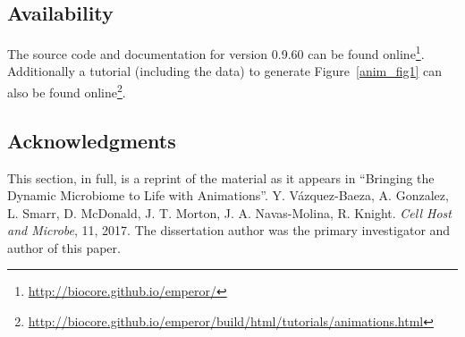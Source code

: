\subsection{Availability}
The source code and documentation for version 0.9.60 can be found online\footnote{\url{http://biocore.github.io/emperor/}}. Additionally a tutorial (including the data) to generate Figure~\ref{anim_fig1} can also be found online\footnote{\url{http://biocore.github.io/emperor/build/html/tutorials/animations.html}}. 

\subsection{Acknowledgments}

This section, in full, is a reprint of the material as it appears in ``Bringing 
the Dynamic Microbiome to Life with Animations''.  Y.  V\'azquez-Baeza, A.  
Gonzalez, L. Smarr, D.  McDonald, J.  T. Morton, J.  A.  Navas-Molina, R.  
Knight. \emph{Cell Host and Microbe}, 11, 2017. The dissertation author 
was the primary investigator and author of this paper.
